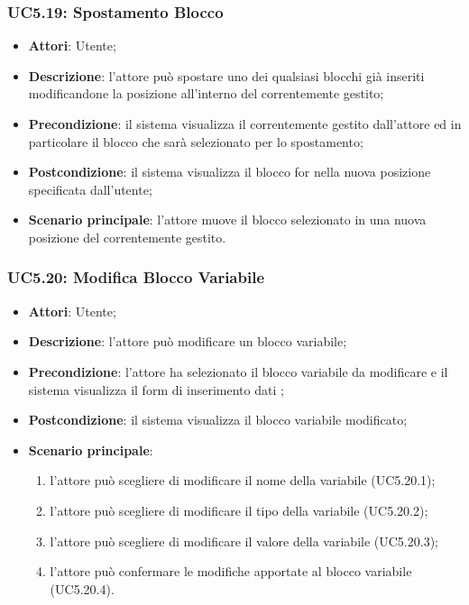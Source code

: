 \subsubsection{UC5.19: Spostamento Blocco}
\label{UC5.19}
\begin{itemize}
	\item \textbf{Attori}: Utente;
	\item \textbf{Descrizione}: l'attore può spostare uno dei qualsiasi blocchi già inseriti modificandone la posizione all'interno del  correntemente gestito;
	\item \textbf{Precondizione}: il sistema visualizza il  correntemente gestito dall'attore ed in particolare il blocco che sarà selezionato per lo spostamento;
	\item \textbf{Postcondizione}: il sistema visualizza il blocco for nella nuova posizione specificata dall'utente;
	\item \textbf{Scenario principale}: l'attore muove il blocco selezionato in una nuova posizione del  correntemente gestito.
\end{itemize}

\subsubsection{UC5.20: Modifica Blocco Variabile}
\label{UC5.20}
\begin{itemize}
	\item \textbf{Attori}: Utente;
	\item \textbf{Descrizione}: l'attore può modificare un blocco variabile;
	\item \textbf{Precondizione}: l'attore ha selezionato il blocco variabile da modificare e il sistema visualizza il form di inserimento dati ;
	\item \textbf{Postcondizione}: il sistema visualizza il blocco variabile modificato;
	\item \textbf{Scenario principale}:
	\begin{enumerate}
		\item l'attore può scegliere di modificare il nome della variabile (UC5.20.1);
		\item l'attore può scegliere di modificare il tipo della variabile (UC5.20.2);
		\item l'attore può scegliere di modificare il valore della variabile (UC5.20.3);
		\item l'attore può confermare le modifiche apportate al blocco variabile (UC5.20.4).
	\end{enumerate}
\end{itemize}

